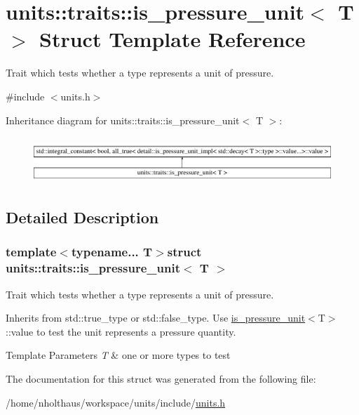 \hypertarget{structunits_1_1traits_1_1is__pressure__unit}{}\section{units\+:\+:traits\+:\+:is\+\_\+pressure\+\_\+unit$<$ T $>$ Struct Template Reference}
\label{structunits_1_1traits_1_1is__pressure__unit}


Trait which tests whether a type represents a unit of pressure.  




{\ttfamily \#include $<$units.\+h$>$}

Inheritance diagram for units\+:\+:traits\+:\+:is\+\_\+pressure\+\_\+unit$<$ T $>$\+:\begin{figure}[H]
\begin{center}
\leavevmode
\includegraphics[height=1.744548cm]{structunits_1_1traits_1_1is__pressure__unit}
\end{center}
\end{figure}


\subsection{Detailed Description}
\subsubsection*{template$<$typename... T$>$struct units\+::traits\+::is\+\_\+pressure\+\_\+unit$<$ T $>$}

Trait which tests whether a type represents a unit of pressure. 

Inherits from {\ttfamily std\+::true\+\_\+type} or {\ttfamily std\+::false\+\_\+type}. Use {\ttfamily \hyperlink{structunits_1_1traits_1_1is__pressure__unit}{is\+\_\+pressure\+\_\+unit}$<$T$>$\+::value} to test the unit represents a pressure quantity. 
\begin{DoxyTemplParams}{Template Parameters}
{\em T} & one or more types to test \\
\hline
\end{DoxyTemplParams}


The documentation for this struct was generated from the following file\+:\begin{DoxyCompactItemize}
\item 
/home/nholthaus/workspace/units/include/\hyperlink{units_8h}{units.\+h}\end{DoxyCompactItemize}
